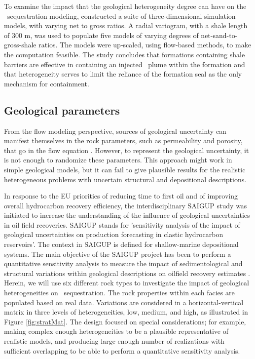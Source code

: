 To examine the impact that the geological heterogeneity degree can have on the \coo\ sequestration modeling, \cite{flett2007heterogeneous} constructed a suite of three-dimensional simulation models, with varying net to gross ratios. A radial variogram, with a shale length of 300 m, was used to
populate five models of varying degrees of net-sand-to-gross-shale ratios. The models were up-scaled, using flow-based methods, to make the computation feasible. The study concludes that formations containing shale barriers are effective in containing an injected \coo\ plume within the formation and that heterogeneity serves to limit the reliance of the formation seal as the only mechanism for containment.

\subsection{Geological parameters}

From the flow modeling perspective, sources of geological uncertainty can
manifest themselves in the rock parameters, such as permeability and porosity, that go in the flow equation . However, to represent the geological uncertainty, it is not enough to randomize these parameters. This approach might work in simple geological models, but it can fail to give plausible results for the realistic heterogeneous problems with uncertain structural and depositional descriptions.

In response to the EU priorities of reducing time to first oil and of improving
overall hydrocarbon recovery efficiency, the interdisciplinary SAIGUP study was
initiated to increase the understanding of the influence of geological
uncertainties in oil field recoveries. SAIGUP stands for 'sensitivity analysis
of the impact of geological uncertainties on production forecasting in clastic
hydrocarbon reservoirs'. The context in SAIGUP is defined for shallow-marine
depositional systems. The main objective of the SAIGUP project has been to
perform a quantitative sensitivity analysis to measure the impact of
sedimentological and structural variations within geological descriptions on 
oilfield recovery estimates
\cite{howell2008sedimentological,manzocchi2008sensitivity,matthews2008assessing}. Herein, we will use six different rock types  to investigate the impact of geological heterogeneities on \coo\ sequestration.  The rock properties within each facies are populated based on real data. Variations are considered in a horizontal-vertical matrix in three levels of heterogeneities, low, medium, and high, as illustrated in Figure \ref{fig:stratMat}. The design focused on special considerations; for example, making complex enough heterogeneities to be a plausible representative of realistic models, and producing large enough number of realizations with sufficient overlapping to be able to perform a quantitative sensitivity analysis.

